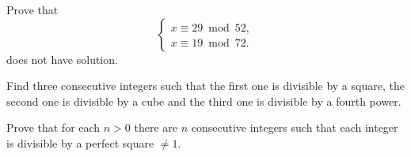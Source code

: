 \begin{exercise}
\label{xca:no_solution}
	Prove that 
	\[
	\begin{cases}
		x\equiv 29\bmod 52,\\
		x\equiv 19\bmod 72.
		\end{cases}
	\]
	does not have solution.
\end{exercise}

\begin{exercise}
\label{xca:consecutive}
	Find three consecutive integers such that the first one is divisible by a square, 
	the second one is divisible by a cube and the third one is divisible by a fourth power. 	
\end{exercise}

\begin{exercise}
\label{xca:perfect_square}
	Prove that 
	for each $n>0$ there are $n$ consecutive integers such that 
	each integer is divisible by a perfect square $\ne 1$. 	
\end{exercise}


